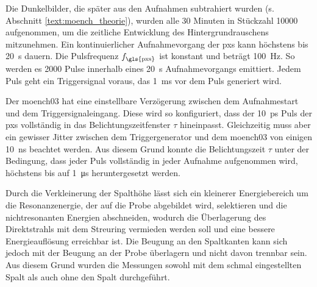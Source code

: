\noindent
Die Dunkelbilder, die später aus den Aufnahmen subtrahiert wurden (s. Abschnitt \ref{text:moench_theorie}), wurden alle 30 Minuten in Stückzahl \num{10000} aufgenommen, um die zeitliche Entwicklung des Hintergrundrauschens mitzunehmen. Ein kontinuierlicher Aufnahmevorgang der \gls{pxs} kann höchstens bis \SI{20}{\second} dauern. Die Pulsfrequenz $f_\text{\gls{pxs}}$ ist konstant und beträgt \SI{100}{\hertz}. So werden es \num{2000} Pulse innerhalb eines \SI{20}{\second} Aufnahmevorgangs emittiert. Jedem Puls geht ein Triggersignal voraus, das \SI{1}{\milli\second} vor dem Puls generiert wird.

\noindent
Der \gls{moench03} hat eine einstellbare Verzögerung zwischen dem Aufnahmestart und dem Triggersignaleingang. Diese wird so konfiguriert, dass der \SI{10}{\pico\second} Puls der \gls{pxs} vollständig in das Belichtungszeitfenster $\tau$ hineinpasst. Gleichzeitig muss aber ein gewisser Jitter zwischen dem Triggergenerator und dem \gls{moench03} von einigen \SI{10}{\nano\second} beachtet werden. Aus diesem Grund konnte die Belichtungszeit $\tau$ unter der Bedingung, dass jeder Puls vollständig in jeder Aufnahme aufgenommen wird, höchstens bis auf \SI{1}{\micro\second} heruntergesetzt werden.

\noindent
Durch die Verkleinerung der Spalthöhe lässt sich ein kleinerer Energiebereich um die Resonanzenergie, der auf die Probe abgebildet wird, selektieren und die nichtresonanten Energien abschneiden, wodurch die Überlagerung des Direktstrahls mit dem Streuring vermieden werden soll und eine bessere Energieauflösung erreichbar ist. Die Beugung an den Spaltkanten kann sich jedoch mit der Beugung an der Probe überlagern und nicht davon trennbar sein. Aus diesem Grund wurden die Messungen sowohl mit dem schmal eingestellten Spalt als auch ohne den Spalt durchgeführt.

